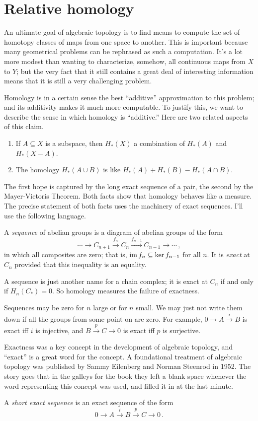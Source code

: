 \section{Relative homology}

An ultimate goal of algebraic topology is to find means to compute the set of homotopy classes of maps from one space to another. This is important because many geometrical problems can be rephrased as such a computation. It's a lot more modest than wanting to characterize, somehow, all continuous maps from $X$ to $Y$; but the very fact that it still contains a great deal of interesting information means that it is still a very challenging problem.

Homology is in a certain sense the best ``additive'' approximation to this problem; and its additivity makes it much more computable. To justify this, we want to describe the sense in which homology is ``additive.'' Here are two related aspects of this claim.
	\begin{enumerate}
	\item If $A\subseteq X$ is a subspace, then $ H_\ast(X)$ a combination of $ H_\ast(A)$ and $H_\ast(X-A)$. 
	\item The homology $ H_\ast(A\cup B)$ is like $ H_\ast(A)+ H_\ast(B)- H_\ast(A\cap B)$. 
	\end{enumerate}
The first hope is captured by the long exact sequence of a pair, the second
by the Mayer-Vietoris Theorem. 
Both facts show that homology behaves like a measure. 
The precise statement of both facts uses the machinery of exact sequences.
I'll use the following language.

\begin{definition}
A {\em sequence} of abelian groups is a diagram of abelian groups of the form 
\[
\cdots\rightarrow C_{n+1}\xrightarrow{f_n}C_n\xrightarrow{f_{n-1}}C_{n-1}
\rightarrow\cdots\,,
\]
in which all composites are zero; that is, $\operatorname{im} f_n\subseteq\ker f_{n-1}$ for all $n$. It is 
{\em exact} at $C_n$ provided that this inequality is an equality. 
\end{definition}
A sequence is just another name for a chain complex; it is exact at 
$C_n$ if and only if $H_n(C_\ast)=0$. So homology measures the failure of exactness.
\begin{example}
Sequences may be zero for $n$ large or for $n$ small. We may just not
write them down if all the groups from some point on are zero. 
For example,
$0\to A\xrightarrow{i}B$ is exact iff $i$ is injective, and $B\xrightarrow{p}C\to 0$ is exact iff $p$ is surjective.
\end{example}
Exactness was a key concept in the development of algebraic topology, and ``exact'' is a great word for the concept. A foundational treatment
\cite{eilenberg-steenrod} of algebraic topology was published by 
Sammy Eilenberg and Norman Steenrod in 1952.
The story goes that in the galleys for the book they left a blank space whenever the word representing this concept was used, and filled it in at the last minute. 
\begin{definition}
A {\em short exact sequence} is an exact sequence of the form 
\[
0\to A\xrightarrow{i}B\xrightarrow{p} C\to 0\,.
\]
\end{definition}

